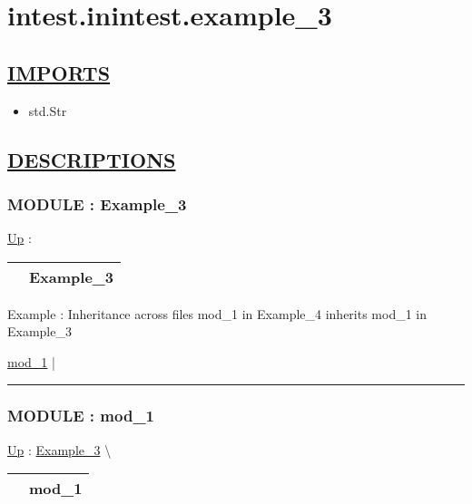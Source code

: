\chapter*{intest.inintest.example\_3}
\hypertarget{ecldoc:toc:intest.inintest.example_3}{}

\section*{\underline{IMPORTS}}
\begin{itemize}
\item std.Str
\end{itemize}

\section*{\underline{DESCRIPTIONS}}
\subsection*{MODULE : Example\_3}
\hypertarget{ecldoc:intest.inintest.Example_3}{}
\hyperlink{ecldoc:toc:intest/inintest}{Up} :

{\renewcommand{\arraystretch}{1.5}
\begin{tabularx}{\textwidth}{|>{\raggedright\arraybackslash}l|X|}
\hline
\hspace{0pt} & Example\_3 \\
\hline
\end{tabularx}
}

\par
Example : Inheritance across files mod\_1 in Example\_4 inherits mod\_1 in Example\_3


\hyperlink{ecldoc:intest.inintest.Example_3.mod_1}{mod\_1}  |

\rule{\linewidth}{0.5pt}

\subsection*{MODULE : mod\_1}
\hypertarget{ecldoc:intest.inintest.Example_3.mod_1}{}
\hyperlink{ecldoc:intest.inintest.Example_3}{Up} :
\hspace{0pt} \hyperlink{ecldoc:intest.inintest.Example_3}{Example_3} \textbackslash 

{\renewcommand{\arraystretch}{1.5}
\begin{tabularx}{\textwidth}{|>{\raggedright\arraybackslash}l|X|}
\hline
\hspace{0pt} & mod\_1 \\
\hline
\end{tabularx}
}


